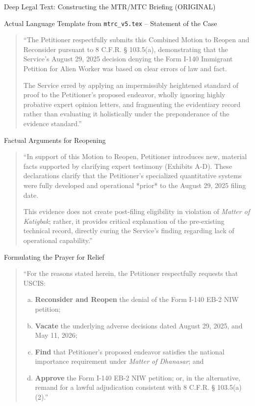 \documentclass[11pt]{beamer}
\begin{document}
	\begin{frame}[allowframebreaks]{Deep Legal Text: Constructing the MTR/MTC Briefing (ORIGINAL)}
		\scriptsize
		\begin{block}{Actual Language Template from \texttt{mtrc\_v5.tex} -- Statement of the Case}
			\begin{quote}
				``The Petitioner respectfully submits this Combined Motion to Reopen and Reconsider pursuant to 8 C.F.R. § 103.5(a), demonstrating that the Service's August 29, 2025 decision denying the Form I-140 Immigrant Petition for Alien Worker was based on clear errors of law and fact. 
				
				The Service erred by applying an impermissibly heightened standard of proof to the Petitioner's proposed endeavor, wholly ignoring highly probative expert opinion letters, and fragmenting the evidentiary record rather than evaluating it holistically under the preponderance of the evidence standard.''
			\end{quote}
		\end{block}
		\framebreak
		\begin{block}{Factual Arguments for Reopening}
			\begin{quote}
				``In support of this Motion to Reopen, Petitioner introduces new, material facts supported by clarifying expert testimony (Exhibits A-D). These declarations clarify that the Petitioner's specialized quantitative systems were fully developed and operational *prior* to the August 29, 2025 filing date. 
				
				This evidence does not create post-filing eligibility in violation of \textit{Matter of Katigbak}; rather, it provides critical explanation of the pre-existing technical record, directly curing the Service’s finding regarding lack of operational capability.''
			\end{quote}
		\end{block}
		\framebreak
		\begin{block}{Formulating the Prayer for Relief}
			\begin{quote}
				``For the reasons stated herein, the Petitioner respectfully requests that USCIS:
				\begin{enumerate}[(a)]
					\item \textbf{Reconsider and Reopen} the denial of the Form I-140 EB-2 NIW petition;
					\item \textbf{Vacate} the underlying adverse decisions dated August 29, 2025, and May 11, 2026;
					\item \textbf{Find} that Petitioner’s proposed endeavor satisfies the national importance requirement under \textit{Matter of Dhanasar}; and
					\item \textbf{Approve} the Form I-140 EB-2 NIW petition; or, in the alternative, remand for a lawful adjudication consistent with 8 C.F.R. § 103.5(a)(2).''
				\end{enumerate}
			\end{quote}
		\end{block}
	\end{frame}
	
\end{document}
